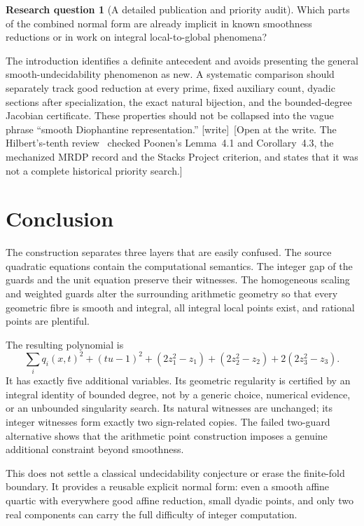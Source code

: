 \documentclass[11pt,a4paper]{article}
\theoremstyle{definition}
\newtheorem{question}[theorem]{Research question}
\theoremstyle{remark}
\newcommand{\wtag}{\textup{[write]}}
\begin{document}
\begin{question}[A detailed publication and priority audit]\label{sdf:q:priority}
Which parts of the combined normal form are already implicit in known
smoothness reductions or in work on integral local-to-global phenomena?
\end{question}
The introduction identifies a definite antecedent and avoids presenting
the general smooth-undecidability phenomenon as new. A systematic comparison
should separately track good reduction at every prime, fixed auxiliary
count, dyadic sections after specialization, the exact natural bijection,
and the bounded-degree Jacobian certificate. These properties should not
be collapsed into the vague phrase ``smooth Diophantine representation.''
\wtag\ [Open at the write. The Hilbert's-tenth review~\cite{review13} checked
Poonen's Lemma~4.1 and Corollary~4.3, the mechanized MRDP record and the
Stacks Project criterion, and states that it was not a complete historical
priority search.]

\section{Conclusion}\label{sdf:sec:conclusion}

The construction separates three layers that are easily confused. The source
quadratic equations contain the computational semantics. The integer gap of
the guards and the unit equation preserve their witnesses. The homogeneous
scaling and weighted guards alter the surrounding arithmetic geometry so
that every geometric fibre is smooth and integral, all integral local
points exist, and rational points are plentiful.

The resulting polynomial is
\[
 \boxed{\sum_i q_i(x,t)^2+(tu-1)^2+
       (2z_1^2-z_1)+(2z_2^2-z_2)+2(2z_3^2-z_3).}
\]
It has exactly five additional variables. Its geometric regularity is
certified by an integral identity of bounded degree, not by a generic
choice, numerical evidence, or an unbounded singularity search. Its
natural witnesses are unchanged; its integer witnesses form exactly two
sign-related copies. The failed two-guard alternative shows that the
arithmetic point construction imposes a genuine additional constraint
beyond smoothness.

This does not settle a classical undecidability conjecture or erase the
finite-fold boundary. It provides a reusable explicit normal form: even a
smooth affine quartic with everywhere good affine reduction, small dyadic
points, and only two real components can carry the full difficulty of
integer computation.
\end{document}
